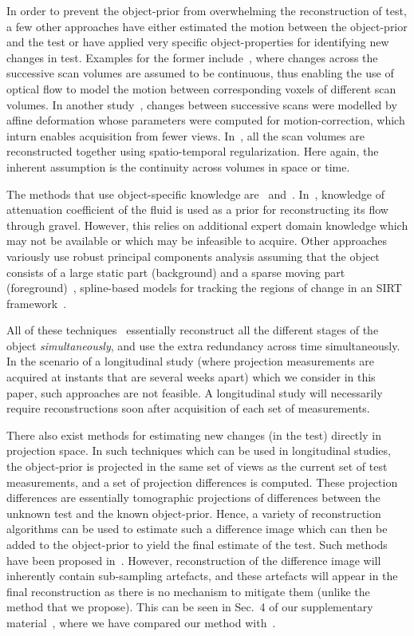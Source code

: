 \documentclass[journal]{IEEEtran}
\begin{document}
In order to prevent the object-prior from overwhelming the
reconstruction of test, a few other approaches have either estimated
the motion between the object-prior and the test or have applied very
specific object-properties for identifying new changes in test.
Examples for the former include~\cite{koen2020}, where changes across
the successive scan volumes are assumed to be continuous, thus
enabling the use of optical flow to model the motion between
corresponding voxels of different scan volumes. In another
study~\cite{vincent2017}, changes between successive scans were
modelled by affine deformation whose parameters were computed for
motion-correction, which inturn enables acquisition from fewer
views. In~\cite{daniil2015}, all the scan volumes are reconstructed
together using spatio-temporal regularization. Here again, the
inherent assumption is the continuity across volumes in space or time.

The methods that use object-specific knowledge are~\cite{Van2015}
and~\cite{Marjolein2016}.  In~\cite{Van2015}, knowledge of attenuation
coefficient of the fluid is used as a prior for reconstructing its
flow through gravel. However, this relies on additional expert domain
knowledge which may not be available or which may be infeasible to
acquire. Other approaches variously use robust principal components
analysis assuming that the object consists of a large static part
(background) and a sparse moving part (foreground)~\cite{HaoGao},
spline-based models for tracking the regions of change in an SIRT
framework~\cite{Van2014}.

All of these
techniques~\cite{daniil2015,koen2020,Van2015,HaoGao,Van2014}
essentially reconstruct all the different stages of the object
\textit{simultaneously}, and use the extra redundancy across time
simultaneously. In the scenario of a longitudinal study (where
projection measurements are acquired at instants that are several
weeks apart) which we consider in this paper, such approaches are not
feasible. A longitudinal study will necessarily require
reconstructions soon after acquisition of each set of measurements.

There also exist methods for estimating new changes (in the test)
directly in projection space. In such techniques which can be used in
longitudinal studies, the object-prior is projected in the same set of
views as the current set of test measurements, and a set of projection
differences is computed. These projection differences are essentially
tomographic projections of differences between the unknown test and
the known object-prior. Hence, a variety of reconstruction algorithms
can be used to estimate such a difference image which can then be
added to the object-prior to yield the final estimate of the
test. Such methods have been proposed
in~\cite{Pourmorteza2015,Lee2012}. However, reconstruction of the
difference image will inherently contain sub-sampling artefacts, and
these artefacts will appear in the final reconstruction as there is no
mechanism to mitigate them (unlike the method that we propose). This
can be seen in Sec.~4 of our supplementary material~\cite{supp_paper},
where we have compared our method with~\cite{Lee2012}.
\end{document}
